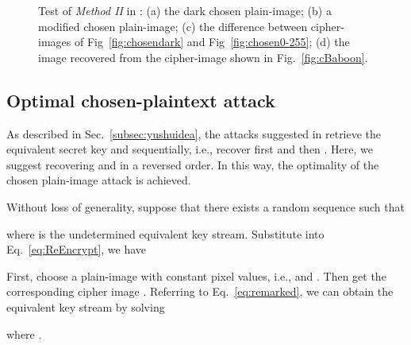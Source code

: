 \documentclass[smallextended, final]{svjour3}          \smartqed
\newlength\imagewidth
\begin{document}
\begin{figure}[!htb]
\centering
{}
\subfigure[]{
    \label{fig:chosen0-255}
    \begin{minipage}[t]{\imagewidth}
    \centering
    \texttt{[image: 0-255]}
    \end{minipage}}
\caption{Test of \textit{Method II} in \cite{zhang2014cryptanalysis}:
(a) the dark chosen plain-image;
(b) a modified chosen plain-image;
(c) the difference between cipher-images of Fig~\ref{fig:chosendark} and Fig~\ref{fig:chosen0-255};
(d) the image recovered from the cipher-image shown in Fig.~\ref{fig:cBaboon}.}
\label{fig:yushuattack2}
\end{figure}

\subsection{Optimal chosen-plaintext attack}
\label{subsec:cpa}
As described in Sec.~\ref{subsec:yushuidea}, the attacks suggested in \cite{zhang2014cryptanalysis} retrieve the equivalent secret key  and 
sequentially, i.e., recover  first and then . Here, we suggest recovering  and  in a reversed order. In this way, the optimality
of the chosen plain-image attack is achieved.

Without loss of generality, suppose that there exists a random sequence  such that

where  is the undetermined equivalent key stream. Substitute  into Eq.~\eqref{eq:ReEncrypt},
we have

First, choose a plain-image  with constant pixel values, i.e.,  and . Then
get the corresponding cipher image .
Referring to Eq.~\eqref{eq:remarked}, we can obtain the equivalent key stream  by solving

where .
\end{document}
